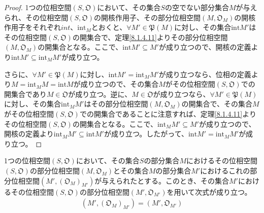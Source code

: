 \documentclass[dvipdfmx]{jsarticle}
\begin{document}
\begin{proof}
1つの位相空間$\left( S,\mathfrak{O} \right)$において、その集合$S$の空でない部分集合$M$が与えられ、その位相空間$\left( S,\mathfrak{O} \right)$の開核作用子、その部分位相空間$\left( M,\mathfrak{O}_{M} \right)$の開核作用子をそれぞれ$int$、${\mathrm{int}}_{M}$とおくと、$\forall M'\in \mathfrak{P}(M)$に対し、その集合${\mathrm{int}}M'$はその位相空間$\left( S,\mathfrak{O} \right)$の開集合で、定理\ref{8.1.4.11}よりその部分位相空間$\left( M,\mathfrak{O}_{M} \right)$の開集合となる。ここで、${\mathrm{int}}M' \subseteq M'$が成り立つので、開核の定義より${\mathrm{int}}M' \subseteq {\mathrm{int}}_{M}M'$が成り立つ。\par
さらに、$\forall M'\in \mathfrak{P}(M)$に対し、${\mathrm{int}}M' = {\mathrm{int}}_{M}M'$が成り立つなら、位相の定義より$M = {\mathrm{int}}_{M}M = {\mathrm{int}}M$が成り立つので、その集合$M$がその位相空間$\left( S,\mathfrak{O} \right)$での開集合であり$M \in \mathfrak{O}$が成り立つ。逆に、$M \in \mathfrak{O}$が成り立つなら、$\forall M'\in \mathfrak{P}(M)$に対し、その集合${\mathrm{int}}_{M}M'$はその部分位相空間$\left( M,\mathfrak{O}_{M} \right)$の開集合で、その集合$M$がその位相空間$\left( S,\mathfrak{O} \right)$での開集合であることに注意すれば、定理\ref{8.1.4.11}よりその位相空間$\left( S,\mathfrak{O} \right)$の開集合となる。ここで、${\mathrm{int}}_{M}M' \subseteq M'$が成り立つので、開核の定義より${\mathrm{int}}_{M}M' \subseteq {\mathrm{int}}M'$が成り立つ。したがって、${\mathrm{int}}M' = {\mathrm{int}}_{M}M'$が成り立つ。
\end{proof}
\begin{thm}\label{8.1.4.13}
1つの位相空間$\left( S,\mathfrak{O} \right)$において、その集合$S$の部分集合$M$におけるその位相空間$\left( S,\mathfrak{O} \right)$の部分位相空間$\left( M,\mathfrak{O}_{M} \right)$とその集合$M$の部分集合$M'$におけるこれの部分位相空間$\left( M',\left( \mathfrak{O}_{M} \right)_{M'} \right)$が与えられたとする。このとき、その集合$M'$におけるその位相空間$\left( S,\mathfrak{O} \right)$の部分位相空間$\left( M',\mathfrak{O}_{M'} \right)$を用いて次式が成り立つ。
\begin{align*}
\left( M',\left( \mathfrak{O}_{M} \right)_{M'} \right) = \left( M',\mathfrak{O}_{M'} \right)
\end{align*}
\end{thm}
\end{document}
